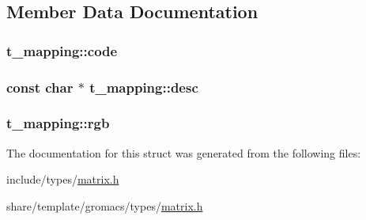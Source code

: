 \subsection{\-Member \-Data \-Documentation}
\hypertarget{structt__mapping_acd95c5cb6dd6d1eb653fad086b60a36c}{
\subsubsection[{code}]{ {\bf t\-\_\-mapping\-::code}}}\label{structt__mapping_acd95c5cb6dd6d1eb653fad086b60a36c}
\hypertarget{structt__mapping_a9efb95dce9813bfb078522cd93e06ea3}{
\subsubsection[{desc}]{\setlength{\rightskip}{0pt plus 5cm}const char $\ast$ {\bf t\-\_\-mapping\-::desc}}}\label{structt__mapping_a9efb95dce9813bfb078522cd93e06ea3}
\hypertarget{structt__mapping_a98417c94f109c3cbc1e9e0b25534216f}{
\subsubsection[{rgb}]{ {\bf t\-\_\-mapping\-::rgb}}}\label{structt__mapping_a98417c94f109c3cbc1e9e0b25534216f}


\-The documentation for this struct was generated from the following files\-:\begin{DoxyCompactItemize}
\item 
include/types/\hyperlink{include_2types_2matrix_8h}{matrix.\-h}\item 
share/template/gromacs/types/\hyperlink{share_2template_2gromacs_2types_2matrix_8h}{matrix.\-h}\end{DoxyCompactItemize}
